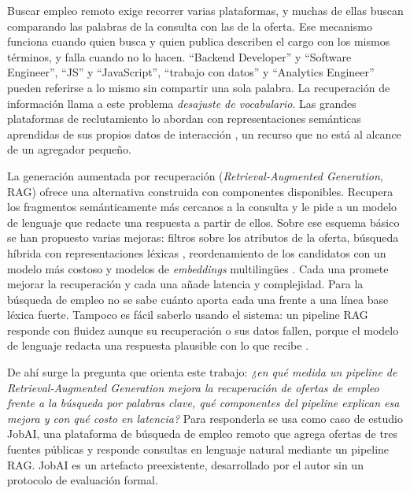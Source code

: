 
Buscar empleo remoto exige recorrer varias plataformas, y muchas de ellas buscan comparando las palabras de la consulta con las de la oferta. Ese mecanismo funciona cuando quien busca y quien publica describen el cargo con los mismos términos, y falla cuando no lo hacen. \enquote{Backend Developer} y \enquote{Software Engineer}, \enquote{JS} y \enquote{JavaScript}, \enquote{trabajo con datos} y \enquote{Analytics Engineer} pueden referirse a lo mismo sin compartir una sola palabra. La recuperación de información llama a este problema \emph{desajuste de vocabulario}. Las grandes plataformas de reclutamiento lo abordan con representaciones semánticas aprendidas de sus propios datos de interacción \citep{HaThuc2017,Shen2024}, un recurso que no está al alcance de un agregador pequeño.

La generación aumentada por recuperación (\textit{Retrieval-Augmented Generation}, RAG) \citep{Lewis2020} ofrece una alternativa construida con componentes disponibles. Recupera los fragmentos semánticamente más cercanos a la consulta y le pide a un modelo de lenguaje que redacte una respuesta a partir de ellos. Sobre ese esquema básico se han propuesto varias mejoras: filtros sobre los atributos de la oferta, búsqueda híbrida con representaciones léxicas \citep{Cormack2009}, reordenamiento de los candidatos con un modelo más costoso \citep{Nogueira2019} y modelos de \textit{embeddings} multilingües \citep{Wang2024mE5}. Cada una promete mejorar la recuperación y cada una añade latencia y complejidad. Para la búsqueda de empleo no se sabe cuánto aporta cada una frente a una línea base léxica fuerte. Tampoco es fácil saberlo usando el sistema: un pipeline RAG responde con fluidez aunque su recuperación o sus datos fallen, porque el modelo de lenguaje redacta una respuesta plausible con lo que recibe \citep{Barnett2024}.

De ahí surge la pregunta que orienta este trabajo: \emph{¿en qué medida un pipeline de Retrieval-Augmented Generation mejora la recuperación de ofertas de empleo frente a la búsqueda por palabras clave, qué componentes del pipeline explican esa mejora y con qué costo en latencia?} Para responderla se usa como caso de estudio JobAI, una plataforma de búsqueda de empleo remoto que agrega ofertas de tres fuentes públicas y responde consultas en lenguaje natural mediante un pipeline RAG. JobAI es un artefacto preexistente, desarrollado por el autor sin un protocolo de evaluación formal.

